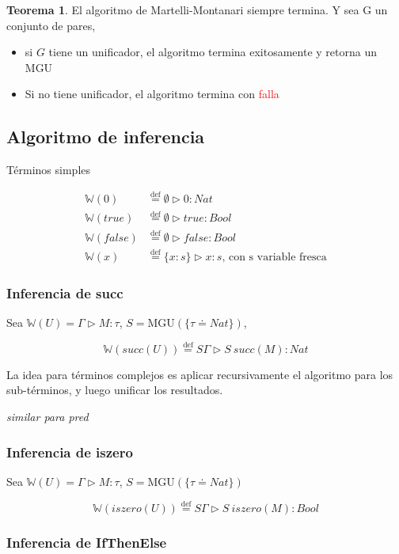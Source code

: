\documentclass{report}
\theoremstyle{definition} %
\newtheorem{theorem}{Teorema}[chapter]
\newcommand{\eqdef}{\overset{\text{def}}{=}}
\newcommand{\tipa}[3]{#1 \rhd #2 : #3} %
\newcommand{\Gtipa}[2]{\tipa{\Gamma}{#1}{#2}}
\newcommand{\suc}[1]{succ(#1)}
\newcommand{\iszero}[1]{iszero(#1)}
\newcommand{\changed}[1]{\textcolor{Red}{#1}}
\newcommand{\tsust}[1]{S#1} %
\newcommand{\infer}[1]{\mathbb{W}(#1)}
\newcommand{\tcontextOne}[2]{\{ #1 : #2 \}} %
\newcommand{\etipa}[2]{\tipa{\emptyset}{#1}{#2}} %
\newcommand{\unify}[2]{#1 \doteq #2}
\newcommand{\mgu}[2]{\text{MGU}(\{ \unify{#1}{#2} \})}
\begin{document}
\begin{theorem}
    El algoritmo de Martelli-Montanari siempre termina. Y sea G un conjunto de
    pares,
    
    \begin{itemize}
        \item si $G$ tiene un unificador, el algoritmo termina exitosamente y
        retorna un MGU
        \item Si no tiene unificador, el algoritmo termina con \changed{falla}
    \end{itemize} 
\end{theorem}

\subsection{Algoritmo de inferencia}

Términos simples

\begin{align*}
    \infer{0} &\eqdef \etipa{0}{Nat}\\
    \infer{true} &\eqdef \etipa{true}{Bool}\\
    \infer{false} &\eqdef \etipa{false}{Bool}\\
    \infer{x} &\eqdef \tipa{\tcontextOne{x}{s}}{x}{s}
    \text{, con s variable fresca}
\end{align*}

\subsubsection{Inferencia de succ}

Sea $\infer{U} = \Gtipa{M}{\tau}$, $S = \mgu{\tau}{Nat}$,

$$\infer{\suc{U}} \eqdef \tipa{\tsust{\Gamma}}{\tsust{\ \suc{M}}}{Nat}$$

La idea para términos complejos es aplicar recursivamente el algoritmo para los
sub-términos, y luego unificar los resultados.

\textit{similar para pred}

\subsubsection{Inferencia de iszero}

Sea $\infer{U} = \Gtipa{M}{\tau}$, $S = \mgu{\tau}{Nat}$

$$\infer{\iszero{U}} \eqdef \tipa{\tsust{\Gamma}}{\tsust{\ \iszero{M}}}{Bool}$$

\subsubsection{Inferencia de IfThenElse}
\end{document}
